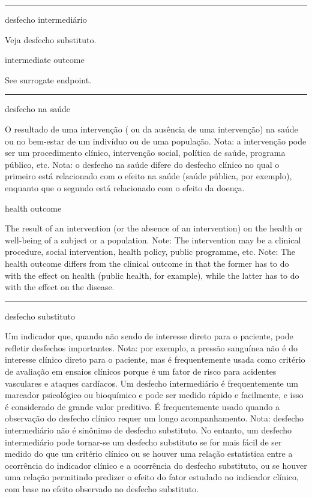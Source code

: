 \documentclass[
]{book}
\begin{document}
\begin{center}\rule{0.5\linewidth}{0.5pt}\end{center}

desfecho intermediário

Veja desfecho substituto.

intermediate outcome

See surrogate endpoint.

\begin{center}\rule{0.5\linewidth}{0.5pt}\end{center}

desfecho na saúde

O resultado de uma intervenção ( ou da ausência de uma intervenção) na saúde ou no bem-estar de um indivíduo ou de uma população. Nota: a intervenção pode ser um procedimento clínico, intervenção social, política de saúde, programa público, etc. Nota: o desfecho na saúde difere do desfecho clínico no qual o primeiro está relacionado com o efeito na saúde (saúde pública, por exemplo), enquanto que o segundo está relacionado com o efeito da doença.

health outcome

The result of an intervention (or the absence of an intervention) on the health or well-being of a subject or a population. Note: The intervention may be a clinical procedure, social intervention, health policy, public programme, etc. Note: The health outcome differs from the clinical outcome in that the former has to do with the effect on health (public health, for example), while the latter has to do with the effect on the disease.

\begin{center}\rule{0.5\linewidth}{0.5pt}\end{center}

desfecho substituto

Um indicador que, quando não sendo de interesse direto para o paciente, pode refletir desfechos importantes. Nota: por exemplo, a pressão sanguínea não é do interesse clínico direto para o paciente, mas é frequentemente usada como critério de avaliação em ensaios clínicos porque é um fator de risco para acidentes vasculares e ataques cardíacos. Um desfecho intermediário é frequentemente um marcador psicológico ou bioquímico e pode ser medido rápido e facilmente, e isso é considerado de grande valor preditivo. É frequentemente usado quando a observação do desfecho clínico requer um longo acompanhamento. Nota: desfecho intermediário não é sinônimo de desfecho substituto. No entanto, um desfecho intermediário pode tornar-se um desfecho substituto se for mais fácil de ser medido do que um critério clínico ou se houver uma relação estatística entre a ocorrência do indicador clínico e a ocorrência do desfecho substituto, ou se houver uma relação permitindo predizer o efeito do fator estudado no indicador clínico, com base no efeito observado no desfecho substituto.
\end{document}

